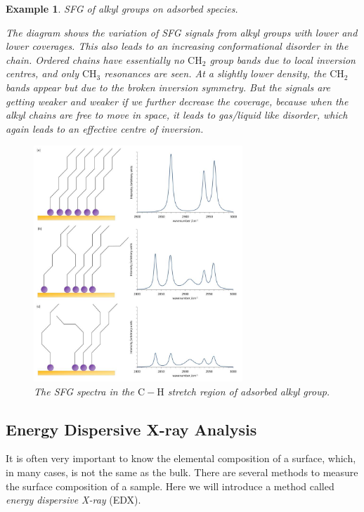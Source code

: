 \documentclass{article}
\theoremstyle{plain}\theoremheaderfont{\normalfont\itshape}\theorembodyfont{\rmfamily}\theoremseparator{.}\newtheorem*{rem}{Remark}\newtheorem*{ex}{Example}\newtheorem*{proof}{Proof}\newtheorem*{altp}{Alternative proof}
\theoremstyle{plain}\theoremheaderfont{\normalfont\bfseries}\theorembodyfont{\rmfamily}\theoremseparator{.}\newtheorem{thm}{Theorem}[section]\newtheorem{lem}[thm]{Lemma}\newtheorem{prop}[thm]{Proposition}\newtheorem*{cor}{Corollary}\newtheorem{defn}[thm]{Definition}\newtheorem{clm}[thm]{Claim}\newtheorem{clminproof}{Claim}\newtheorem*{law}{Law}\newtheorem{pos}[thm]{Postulate}
\theoremstyle{break}\theoremheaderfont{\normalfont\itshape}\theorembodyfont{\rmfamily}\theoremseparator{.\medskip}\newtheorem*{proofskip}{Proof}\newtheorem*{exs}{Examples}\newtheorem*{rems}{Remarks}
\theoremstyle{break}\theoremheaderfont{\normalfont\bfseries}\theorembodyfont{\rmfamily}\theoremseparator{.\medskip}\newtheorem{lemskip}[thm]{Lemma}\newtheorem{defnskip}[thm]{Definition}\newtheorem{propskip}[thm]{Proposition}\newtheorem{thmskip}[thm]{Theorem}
\numberwithin{equation}{section}
\begin{document}
	\begin{ex}
		\textit{SFG of alkyl groups on adsorbed species.}

		The diagram shows the variation of SFG signals from alkyl groups with lower and lower coverages. This also leads to an increasing conformational disorder in the chain. Ordered chains have essentially no \(\mathrm{CH_2}\) group bands due to local inversion centres, and only \(\mathrm{CH_3}\) resonances are seen. At a slightly lower density, the \(\mathrm{CH_2}\) bands appear but due to the broken inversion symmetry. But the signals are getting weaker and weaker if we further decrease the coverage, because when the alkyl chains are free to move in space, it leads to gas/liquid like disorder, which again leads to an effective centre of inversion.

		\begin{figure}[ht!]
			\centering
			\includegraphics[width=0.7\textwidth]{SFG.jpg}
			\caption{The SFG spectra in the \(\mathrm{C-H}\) stretch region of adsorbed alkyl group.}
		\end{figure}
	\end{ex}

	\subsection{Energy Dispersive X-ray Analysis}
	It is often very important to know the elemental composition of a surface, which, in many cases, is not the same as the bulk. There are several methods to measure the surface composition of a sample. Here we will introduce a method called \textit{energy dispersive X-ray} (EDX).
\end{document}
